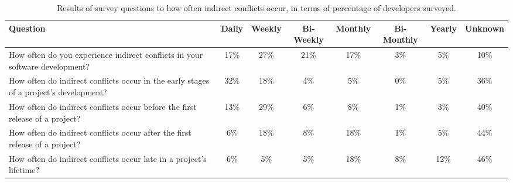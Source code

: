 \documentclass[conference]{IEEEtran}
\begin{document}
\begin{table*}[tb!]
\begin{center}
\begin{tabular}{| p{7cm} | c | c | c | c | c | c | c |}
\hline
Question & Daily & Weekly & Bi-Weekly & Monthly & Bi-Monthly & Yearly & Unknown \\
\hline
\hline
How often do you experience indirect conflicts in your software development? & 17\% & 27\% & 21\% & 17\% & 3\% & 5\% & 10\% \\ \hline
How often do indirect conflicts occur in the early stages of a project’s development? & 32\% & 18\% & 4\% & 5\% & 0\% & 5\% & 36\% \\ \hline
How often do indirect conflicts occur before the first release of a project? & 13\% & 29\% & 6\% & 8\% & 1\% & 3\% & 40\% \\ \hline
How often do indirect conflicts occur after the first release of a project? & 6\% & 18\% & 8\% & 18\% & 1\% & 5\% & 44\% \\ \hline
How often do indirect conflicts occur late in a project’s lifetime? & 6\% & 5\% & 5\% & 18\% & 8\% & 12\% & 46\% \\ \hline
\end{tabular}
\end{center}
\caption{Results of survey questions to how often indirect conflicts occur, in terms of percentage
of developers surveyed.\label{tab:often}}
\end{table*}
\end{document}
